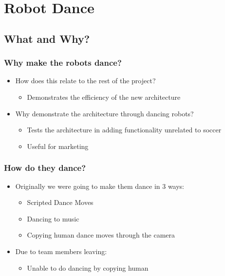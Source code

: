 \documentclass{beamer}
\begin{document}
\section{Robot Dance}
	\subsection{What and Why?} %
	\begin{frame}
		\sectionpage %
	\end{frame}
	\begin{frame}
		\frametitle{Why make the robots dance?}
		\begin{itemize}
			\item How does this relate to the rest of the project?
			\begin{itemize}
				\item Demonstrates the efficiency of the new architecture
			\end{itemize}
			\item Why demonstrate the architecture through dancing robots?
			\begin{itemize}
				\item Tests the architecture in adding functionality unrelated to soccer
				\item Useful for marketing
			\end{itemize}
		\end{itemize}
	\end{frame}
	\begin{frame}
		\frametitle{How do they dance?}
		\begin{itemize}
			\item Originally we were going to make them dance in 3 ways:
			\begin{itemize}
				\item Scripted Dance Moves
				\item Dancing to music
				\item Copying human dance moves through the camera
			\end{itemize}
			\item Due to team members leaving:
			\begin{itemize}
				\item Unable to do dancing by copying human
			\end{itemize}
		\end{itemize}
	\end{frame}
\end{document}
